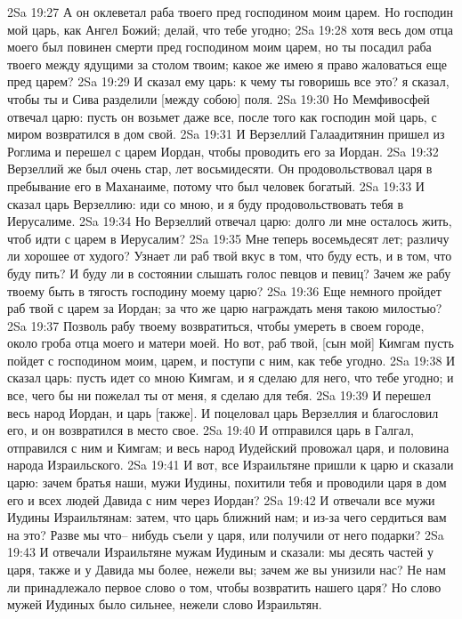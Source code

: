 2Sa 19:27  А он оклеветал раба твоего пред господином моим царем. Но господин мой царь, как Ангел Божий; делай, что тебе угодно;
2Sa 19:28  хотя весь дом отца моего был повинен смерти пред господином моим царем, но ты посадил раба твоего между ядущими за столом твоим; какое же имею я право жаловаться еще пред царем?
2Sa 19:29  И сказал ему царь: к чему ты говоришь все это? я сказал, чтобы ты и Сива разделили [между собою] поля.
2Sa 19:30  Но Мемфивосфей отвечал царю: пусть он возьмет даже все, после того как господин мой царь, с миром возвратился в дом свой.
2Sa 19:31  И Верзеллий Галаадитянин пришел из Роглима и перешел с царем Иордан, чтобы проводить его за Иордан.
2Sa 19:32  Верзеллий же был очень стар, лет восьмидесяти. Он продовольствовал царя в пребывание его в Маханаиме, потому что был человек богатый.
2Sa 19:33  И сказал царь Верзеллию: иди со мною, и я буду продовольствовать тебя в Иерусалиме.
2Sa 19:34  Но Верзеллий отвечал царю: долго ли мне осталось жить, чтоб идти с царем в Иерусалим?
2Sa 19:35  Мне теперь восемьдесят лет; различу ли хорошее от худого? Узнает ли раб твой вкус в том, что буду есть, и в том, что буду пить? И буду ли в состоянии слышать голос певцов и певиц? Зачем же рабу твоему быть в тягость господину моему царю?
2Sa 19:36  Еще немного пройдет раб твой с царем за Иордан; за что же царю награждать меня такою милостью?
2Sa 19:37  Позволь рабу твоему возвратиться, чтобы умереть в своем городе, около гроба отца моего и матери моей. Но вот, раб твой, [сын мой] Кимгам пусть пойдет с господином моим, царем, и поступи с ним, как тебе угодно.
2Sa 19:38  И сказал царь: пусть идет со мною Кимгам, и я сделаю для него, что тебе угодно; и все, чего бы ни пожелал ты от меня, я сделаю для тебя.
2Sa 19:39  И перешел весь народ Иордан, и царь [также]. И поцеловал царь Верзеллия и благословил его, и он возвратился в место свое.
2Sa 19:40  И отправился царь в Галгал, отправился с ним и Кимгам; и весь народ Иудейский провожал царя, и половина народа Израильского.
2Sa 19:41  И вот, все Израильтяне пришли к царю и сказали царю: зачем братья наши, мужи Иудины, похитили тебя и проводили царя в дом его и всех людей Давида с ним через Иордан?
2Sa 19:42  И отвечали все мужи Иудины Израильтянам: затем, что царь ближний нам; и из-за чего сердиться вам на это? Разве мы что-- нибудь съели у царя, или получили от него подарки?
2Sa 19:43  И отвечали Израильтяне мужам Иудиным и сказали: мы десять частей у царя, также и у Давида мы более, нежели вы; зачем же вы унизили нас? Не нам ли принадлежало первое слово о том, чтобы возвратить нашего царя? Но слово мужей Иудиных было сильнее, нежели слово Израильтян.
